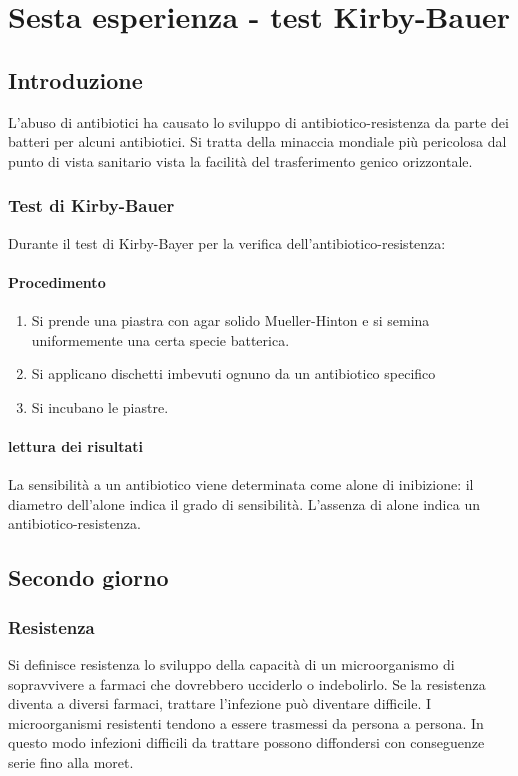 \section{Sesta esperienza - test Kirby-Bauer}

	\subsection{Introduzione}
	L'abuso di antibiotici ha causato lo sviluppo di antibiotico-resistenza da parte dei batteri per alcuni antibiotici.
	Si tratta della minaccia mondiale pi\`u pericolosa dal punto di vista sanitario vista la facilit\`a del trasferimento genico orizzontale.
	
		\subsubsection{Test di Kirby-Bauer}
		Durante il test di Kirby-Bayer per la verifica dell'antibiotico-resistenza:
			
			\paragraph{Procedimento}
			\begin{enumerate}
				\item Si prende una piastra con agar solido Mueller-Hinton e si semina uniformemente una certa specie batterica.
				\item Si applicano dischetti imbevuti ognuno da un antibiotico specifico
				\item Si incubano le piastre.
			\end{enumerate}

			\paragraph{lettura dei risultati}
			La sensibilit\`a a un antibiotico viene determinata come alone di inibizione: il diametro dell'alone indica il grado di sensibilit\`a.
			L'assenza di alone indica un antibiotico-resistenza.
	\subsection{Secondo giorno}

		\subsubsection{Resistenza}
		Si definisce resistenza lo sviluppo della capacit\`a di un microorganismo di sopravvivere a farmaci che dovrebbero ucciderlo o indebolirlo.
		Se la resistenza diventa a diversi farmaci, trattare l'infezione pu\`o diventare difficile.
		I microorganismi resistenti tendono a essere trasmessi da persona a persona.
		In questo modo infezioni difficili da trattare possono diffondersi con conseguenze serie fino alla moret.

